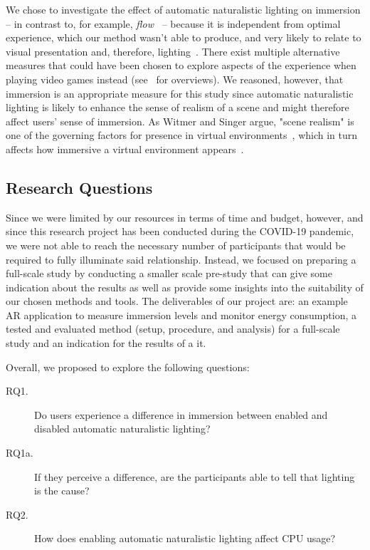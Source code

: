 \documentclass[12pt,twoside,english]{article}
\begin{document}
We chose to investigate the effect of automatic naturalistic lighting on immersion -- in contrast to, for example, \textit{flow}~\cite{csikszentmihalyi_flow_1990} -- because it is independent from optimal experience, which our method wasn't able to produce, and very likely to relate to visual presentation and, therefore, lighting~\cite{jennett_measuring_2008}.
There exist multiple alternative measures that could have been chosen to explore aspects of the experience when playing video games instead (see~\cite{dey_systematic_2018, dunser_survey_2008} for overviews).
We reasoned, however, that immersion is an appropriate measure for this study since automatic naturalistic lighting is likely to enhance the sense of realism of a scene and might therefore affect users' sense of immersion.
As Witmer and Singer argue, "scene realism" is one of the governing factors for presence in virtual environments~\cite{witmer_measuring_1998}, which in turn affects how immersive a virtual environment appears~\cite{jennett_measuring_2008}.

\subsection{Research Questions}

Since we were limited by our resources in terms of time and budget, however, and since this research project has been conducted during the COVID-19 pandemic, we were not able to reach the necessary number of participants that would be required to fully illuminate said relationship.
Instead, we focused on preparing a full-scale study by conducting a smaller scale pre-study that can give some indication about the results as well as provide some insights into the suitability of our chosen methods and tools.
The deliverables of our project are: an example \gls{AR} application to measure immersion levels and monitor energy consumption, a tested and evaluated method (setup, procedure, and analysis) for a full-scale study and an indication for the results of a it.


Overall, we proposed to explore the following questions:

\begin{description}
    \item[RQ1.] Do users experience a difference in immersion between enabled and disabled automatic naturalistic lighting?
    \item[RQ1a.] If they perceive a difference, are the participants able to tell that lighting is the cause?
    \item[RQ2.] How does enabling automatic naturalistic lighting affect \gls{CPU} usage?
\end{description}
\end{document}
